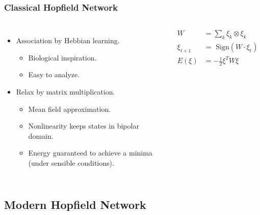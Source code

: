 \begin{frame}
	
    \frametitle{Classical Hopfield Network}
    \begin{columns}[c]
        \begin{itemize}
            \item Association by Hebbian learning.
            \begin{itemize}
                \item Biological inspiration.
                \item Easy to analyze.
            \end{itemize}
            \item Relax by matrix multiplication.
            \begin{itemize}
                \item Mean field approximation.
                \item Nonlinearity keeps states in bipolar domain.
                \item Energy guaranteed to achieve a minima (under sensible conditions).
            \end{itemize}
        \end{itemize}

        \begin{align}
            W &= \sum_{k} \xi_k \otimes \xi_k \\
            \xi_{t+1} &= \text{ Sign}\left( W \cdot \xi_{t} \right) \\
            E \left( \xi \right) &= -\frac{1}{2} \xi^T W \xi
        \end{align}
    \end{columns}
\end{frame}


\subsection{Modern Hopfield Network} 

